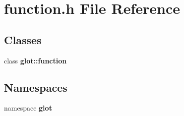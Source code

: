 \section{function.h File Reference}
\label{function_8h}
\subsection*{Classes}
\begin{CompactItemize}
\item 
class {\bf glot::function}
\end{CompactItemize}
\subsection*{Namespaces}
\begin{CompactItemize}
\item 
namespace {\bf glot}
\end{CompactItemize}
